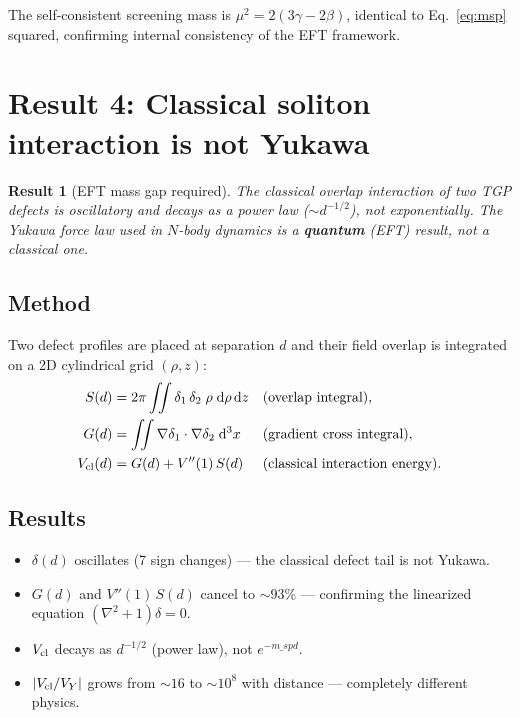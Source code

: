 \documentclass[11pt,a4paper]{article}
\def\msp{m\_sp}%
\newcommand{\msp}{m_{\rm sp}}
\newtheorem{result}{Result}
\begin{document}
\medskip\noindent
The self-consistent screening mass is $\mu^2 = 2(3\gamma - 2\beta)$,
identical to Eq.~\eqref{eq:msp} squared, confirming internal consistency
of the EFT framework.

\section{Result 4: Classical soliton interaction is not Yukawa}
\label{sec:soliton-interaction}

\begin{result}[EFT mass gap required]
The classical overlap interaction of two TGP defects is oscillatory and
decays as a power law ($\sim d^{-1/2}$), not exponentially.  The Yukawa
force law used in $N$-body dynamics is a \textbf{quantum} (EFT) result,
not a classical one.
\end{result}

\subsection{Method}

Two defect profiles are placed at separation $d$ and their field overlap
is integrated on a 2D cylindrical grid $(\rho, z)$:
\begin{align}
  S(d) &= 2\pi \iint \delta_1\,\delta_2\;\rho\;\mathrm{d}\rho\,\mathrm{d}z
    & &\text{(overlap integral)},
    \label{eq:S}\\
  G(d) &= \iint \nabla\delta_1 \cdot \nabla\delta_2 \;\mathrm{d}^3x
    & &\text{(gradient cross integral)},
    \label{eq:G}\\
  V_{\rm cl}(d) &= G(d) + V''(1)\,S(d)
    & &\text{(classical interaction energy)}.
    \label{eq:Vcl}
\end{align}

\subsection{Results}

\begin{itemize}[nosep]
  \item $\delta(d)$ oscillates (7 sign changes) --- the classical defect
        tail is not Yukawa.
  \item $G(d)$ and $V''(1)\,S(d)$ cancel to $\sim93\%$ --- confirming
        the linearized equation $(\nabla^2 + 1)\delta = 0$.
  \item $V_{\rm cl}$ decays as $d^{-1/2}$ (power law), not $e^{-\msp d}$.
  \item $|V_{\rm cl}/V_Y|$ grows from $\sim16$ to $\sim10^8$ with distance
        --- completely different physics.
\end{itemize}
\end{document}
